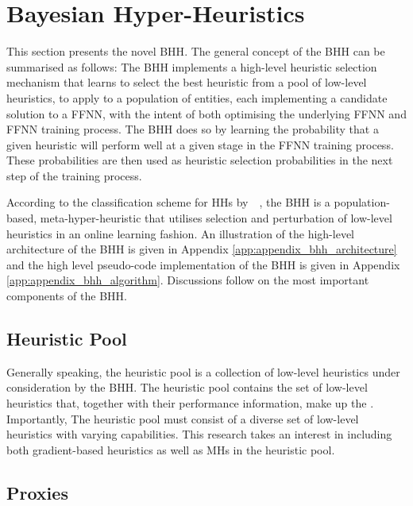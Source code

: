 \section{Bayesian Hyper-Heuristics}
\label{sec:bhh}

This section presents the novel \acs{BHH}. The general concept of the \acs{BHH} can be summarised as follows: The \acs{BHH} implements a high-level heuristic selection mechanism that learns to select the best heuristic from a pool of low-level heuristics, to apply to a population of entities, each implementing a candidate solution to a \acs{FFNN}, with the intent of both optimising the underlying \acs{FFNN} and \acs{FFNN} training process. The \acs{BHH} does so by learning the probability that a given heuristic will perform well at a given stage in the \acs{FFNN} training process. These probabilities are then used as heuristic selection probabilities in the next step of the training process.

According to the classification scheme for \acp{HH} by~\citeauthor{ref:burke:2010}~\cite{ref:burke:2010}, the \Acs{BHH} is a population-based, meta-hyper-heuristic that utilises selection and perturbation of low-level heuristics in an online learning fashion. An illustration of the high-level architecture of the \Acs{BHH} is given in Appendix \ref{app:appendix_bhh_architecture} and the high level pseudo-code implementation of the \acs{BHH} is given in Appendix \ref{app:appendix_bhh_algorithm}. Discussions follow on the most important components of the \acs{BHH}.

\subsection{Heuristic Pool}\label{sec:bhh:heuristic_pool}

Generally speaking, the heuristic pool is a collection of low-level heuristics under consideration by the \acs{BHH}. The heuristic pool contains the set of low-level heuristics that, together with their performance information, make up the . Importantly, The heuristic pool must consist of a diverse set of low-level heuristics with varying capabilities. This research takes an interest in including both gradient-based heuristics as well as \acp{MH} in the heuristic pool.

\subsection{Proxies}\label{sec:bhh:heuristic:proxies}

